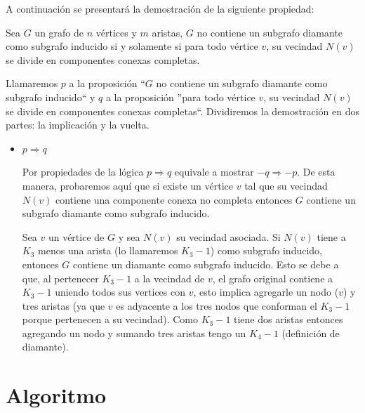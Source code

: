 \documentclass[a4paper,11pt] {article}
\begin{document}
A continuaci\'on se presentar\'a la demostraci\'on de la siguiente propiedad:

Sea $G$ un grafo de $n$ v\'ertices y $m$ aristas, $G$ no contiene un subgrafo diamante como subgrafo inducido si y solamente si para todo v\'ertice $v$, su vecindad $N(v)$ se divide en componentes conexas completas.

Llamaremos $p$ a la proposici\'on ``$G$ no contiene un subgrafo diamante como subgrafo inducido`` y $q$ a la proposici\'on ''para todo v\'ertice $v$, su vecindad $N(v)$ se divide en componentes conexas completas``. Dividiremos la demostraci\'on en dos partes: la implicaci\'on y la vuelta.

\begin{itemize}
\item $p \Longrightarrow q$

Por propiedades de la l\'ogica $p \Longrightarrow q$ equivale a mostrar $-q \Longrightarrow -p$. De esta manera, probaremos aqu\'i que si existe un v\'ertice $v$ tal que su vecindad $N(v)$ contiene una componente conexa no completa entonces $G$ contiene un subgrafo diamante como subgrafo inducido.

Sea $v$ un v\'ertice de $G$ y sea $N(v)$ su vecindad asociada. Si $N(v)$ tiene a $K_{3}$ menos una arista (lo llamaremos $K_{3}-1$) como subgrafo inducido, entonces $G$ contiene un diamante como subgrafo inducido. Esto se debe a que, al pertenecer $K_{3}-1$ a la vecindad de $v$, el grafo original contiene a $K_{3}-1$ uniendo todos sus vertices con $v$, esto implica agregarle un nodo ($v$) y tres aristas (ya que $v$ es adyacente a los tres nodos que conforman el $K_{3}-1$ porque pertenecen a su vecindad). Como $K_{3}-1$ tiene dos aristas entonces agregando un nodo y sumando tres aristas tengo un $K_{4}-1$ (definici\'on de diamante).
\end{itemize}


\section*{Algoritmo}

% 
\end{document}
